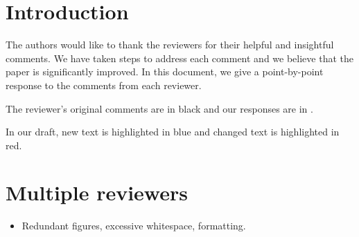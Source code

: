 \documentclass{vldb}
\newcommand{\resp}[1]{{\color{blue}{#1}}}
\begin{document}
\section{Introduction}
The authors would like to thank the reviewers for their helpful and insightful comments.
We have taken steps to address each comment and we believe that the paper is significantly improved.
In this document, we give a point-by-point response to the comments from each reviewer.

The reviewer's original comments are in black and our responses are in \resp{blue}.

In our draft, new text is highlighted in {\color{blue}blue} and changed text is highlighted in {\color{red}red}.

\section{Multiple reviewers}
\begin{itemize}
\item Redundant figures, excessive whitespace, formatting.
  
  \resp{We've compressed many of the figures and removed whitespace to make room for additional material.}
\end{itemize}
\end{document}
